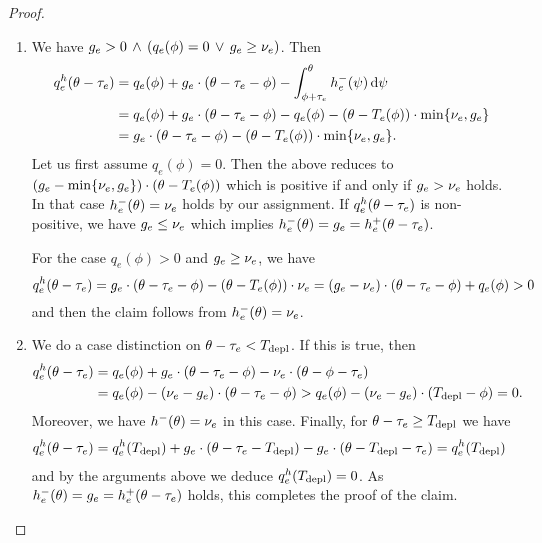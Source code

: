 \begin{proof}
\begin{enumerate}[label=\textbf{Case \Roman*.}, wide=0.5em]
        \item We have $g_e > 0 \,\land\, \left( q_e(\phi) = 0 \,\lor\, g_e \geq \capa_e \right)$.
        Then \begin{align*}
            q_e^h(\theta - \transit_e) &= q_e(\phi) + g_e \cdot (\theta - \transit_e - \phi) - \int_{\phi + \transit_e}^{\theta} \outfl[h]_e(\psi)\diff \psi \\
            &= q_e(\phi) + g_e\cdot (\theta - \transit_e - \phi) - q_e(\phi) - (\theta - T_e(\phi))\cdot \min\{\capa_e, g_e\} \\
            &= g_e\cdot(\theta -\transit_e - \phi) - (\theta - T_e(\phi))\cdot \min\{\capa_e, g_e\}.
        \end{align*}
        Let us first assume $q_e(\phi) = 0$.
        Then the above reduces to $(g_e - \min\{\capa_e,g_e\})\cdot (\theta - T_e(\phi))$ which is positive if and only if $g_e > \capa_e$ holds.
        In that case $\outfl[h]_e(\theta) = \capa_e$ holds by our assignment.
        If $q_e^h(\theta - \transit_e)$ is non-positive, we have $g_e \leq \capa_e$ which implies $\outfl[h]_e(\theta) = g_e = \infl[h]_e(\theta - \transit_e)$.

        For the case $q_e(\phi) > 0$ and $g_e \geq \capa_e$, we have \[
            q_e^h(\theta - \transit_e) = g_e\cdot(\theta - \transit_e - \phi) - (\theta - T_e(\phi)) \cdot \capa_e = (g_e - \capa_e) \cdot (\theta - \transit_e - \phi) + q_e(\phi) > 0
        \]
        and then the claim follows from $\outfl[h]_e(\theta) = \capa_e$.

        \item We do a case distinction on $\theta - \transit_e < T_{\depl}$.
        If this is true, then \begin{align*}
            q^h_e (\theta - \transit_e)
            &= q_e(\phi) + g_e\cdot (\theta-\transit_e-\phi) - \capa_e\cdot (\theta - \phi - \transit_e)\\
            &= q_e(\phi) - (\capa_e - g_e) \cdot (\theta - \transit_e - \phi)
            > q_e(\phi) - (\capa_e - g_e) \cdot (T_{\depl} - \phi) = 0.
        \end{align*}
        Moreover, we have $\outfl[h](\theta) = \capa_e$ in this case.
        Finally, for $\theta - \transit_e \geq T_{\depl}$ we have
        \begin{align*}
            q^h_e (\theta - \transit_e)
            &= q^h_e(T_{\depl}) + g_e \cdot (\theta - \transit_e - T_{\depl}) - g_e \cdot (\theta - T_{\depl} - \transit_e) = q^h_e(T_{\depl})
        \end{align*}
        and by the arguments above we deduce $q^h_e(T_{\depl}) = 0$.
        As $\outfl[h]_e(\theta) = g_e = \infl[h]_e(\theta - \transit_e)$ holds, this completes the proof of the claim.
    \end{enumerate}


\end{proof}

